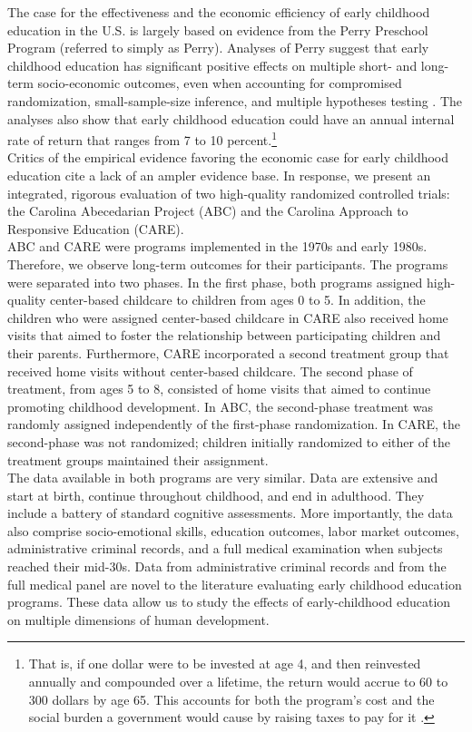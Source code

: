 \noindent  The case for the effectiveness and the economic efficiency of early childhood education in the U.S. is largely based on evidence from the Perry Preschool Program (referred to simply as Perry). Analyses of Perry suggest that early childhood education has significant positive effects on multiple short- and long-term socio-economic outcomes, even when accounting for compromised randomization, small-sample-size inference, and multiple hypotheses testing \citep{Heckman_Moon_etal_2010_QE}. The analyses also show that early childhood education could have an annual internal rate of return that ranges from 7 to 10 percent.\footnote{That is, if one dollar were to be invested at age 4, and then reinvested annually and compounded over a lifetime, the return would accrue to 60 to 300 dollars by age 65. This accounts for both the program's cost and the social burden a government would cause by raising taxes to pay for it \citep{Heckman_Moon_etal_2010_RateofReturn}.}\\

\noindent Critics of the empirical evidence favoring the economic case for early childhood education cite a lack of an ampler evidence base. In response, we present an integrated, rigorous evaluation of two high-quality randomized controlled trials: the Carolina Abecedarian Project (ABC) and the Carolina Approach to Responsive Education (CARE).\\ 

\noindent ABC and CARE were programs implemented in the 1970s and early 1980s. Therefore, we observe long-term outcomes for their participants. The programs were separated into two phases. In the first phase, both programs assigned high-quality center-based childcare to children from ages 0 to 5. In addition, the children who were assigned center-based childcare in CARE also received home visits that aimed to foster the relationship between participating children and their parents. Furthermore, CARE incorporated a second treatment group that received home visits without center-based childcare. The second phase of treatment, from ages 5 to 8, consisted of home visits that aimed to continue promoting childhood development. In ABC, the second-phase treatment was randomly assigned independently of the first-phase randomization. In CARE, the second-phase was not randomized; children initially randomized to either of the treatment groups maintained their assignment.\\

\noindent The data available in both programs are very similar. Data are extensive and start at birth, continue throughout childhood, and end in adulthood. They include a battery of standard cognitive assessments. More importantly, the data also comprise socio-emotional skills, education outcomes, labor market outcomes, administrative criminal records, and a full medical examination when subjects reached their mid-30s. Data from administrative criminal records and from the full medical panel are novel to the literature evaluating early childhood education programs. These data allow us to study the effects of early-childhood education on multiple dimensions of human development.\\

